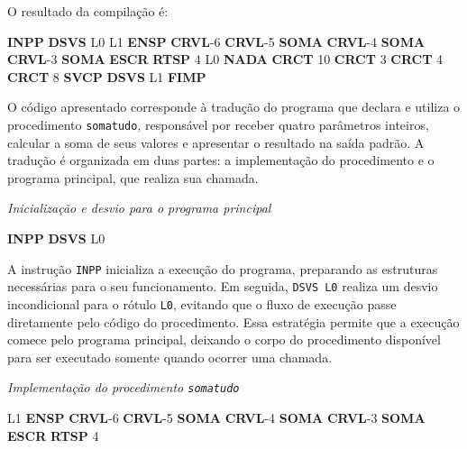 \documentclass[
  brazilian,
  letterpaper,
]{book}
\newenvironment{Shaded}{\begin{snugshade}}{\end{snugshade}}
\newcommand{\DecValTok}[1]{\textcolor[rgb]{0.68,0.00,0.00}{#1}}
\newcommand{\FunctionTok}[1]{\textcolor[rgb]{0.28,0.35,0.67}{#1}}
\newcommand{\KeywordTok}[1]{\textcolor[rgb]{0.00,0.23,0.31}{\textbf{#1}}}
\newcommand{\NormalTok}[1]{\textcolor[rgb]{0.00,0.23,0.31}{#1}}
\theoremstyle{plain}
\theoremstyle{definition}
\theoremstyle{remark}
\begin{document}
O resultado da compilação é:

\begin{Shaded}
\begin{Highlighting}[]
    \KeywordTok{INPP}
    \KeywordTok{DSVS}    \FunctionTok{L0}
\FunctionTok{L1}  \KeywordTok{ENSP}
    \KeywordTok{CRVL}\NormalTok{    {-}}\DecValTok{6}
    \KeywordTok{CRVL}\NormalTok{    {-}}\DecValTok{5}
    \KeywordTok{SOMA}
    \KeywordTok{CRVL}\NormalTok{    {-}}\DecValTok{4}
    \KeywordTok{SOMA}
    \KeywordTok{CRVL}\NormalTok{    {-}}\DecValTok{3}
    \KeywordTok{SOMA}
    \KeywordTok{ESCR}
    \KeywordTok{RTSP}    \DecValTok{4}
\FunctionTok{L0}  \KeywordTok{NADA}
    \KeywordTok{CRCT}    \DecValTok{10}
    \KeywordTok{CRCT}    \DecValTok{3}
    \KeywordTok{CRCT}    \DecValTok{4}
    \KeywordTok{CRCT}    \DecValTok{8}
    \KeywordTok{SVCP}
    \KeywordTok{DSVS}    \FunctionTok{L1}
    \KeywordTok{FIMP}
\end{Highlighting}
\end{Shaded}

O código apresentado corresponde à tradução do programa que declara e
utiliza o procedimento \texttt{somatudo}, responsável por receber quatro
parâmetros inteiros, calcular a soma de seus valores e apresentar o
resultado na saída padrão. A tradução é organizada em duas partes: a
implementação do procedimento e o programa principal, que realiza sua
chamada.

\emph{Inicialização e desvio para o programa principal}

\begin{Shaded}
\begin{Highlighting}[]
    \KeywordTok{INPP}
    \KeywordTok{DSVS}    \FunctionTok{L0}
\end{Highlighting}
\end{Shaded}

A instrução \texttt{INPP} inicializa a execução do programa, preparando
as estruturas necessárias para o seu funcionamento. Em seguida,
\texttt{DSVS\ L0} realiza um desvio incondicional para o rótulo
\texttt{L0}, evitando que o fluxo de execução passe diretamente pelo
código do procedimento. Essa estratégia permite que a execução comece
pelo programa principal, deixando o corpo do procedimento disponível
para ser executado somente quando ocorrer uma chamada.

\emph{Implementação do procedimento \texttt{somatudo}}

\begin{Shaded}
\begin{Highlighting}[]
\FunctionTok{L1}  \KeywordTok{ENSP}
    \KeywordTok{CRVL}\NormalTok{    {-}}\DecValTok{6}
    \KeywordTok{CRVL}\NormalTok{    {-}}\DecValTok{5}
    \KeywordTok{SOMA}
    \KeywordTok{CRVL}\NormalTok{    {-}}\DecValTok{4}
    \KeywordTok{SOMA}
    \KeywordTok{CRVL}\NormalTok{    {-}}\DecValTok{3}
    \KeywordTok{SOMA}
    \KeywordTok{ESCR}
    \KeywordTok{RTSP}    \DecValTok{4}
\end{Highlighting}
\end{Shaded}
\end{document}
